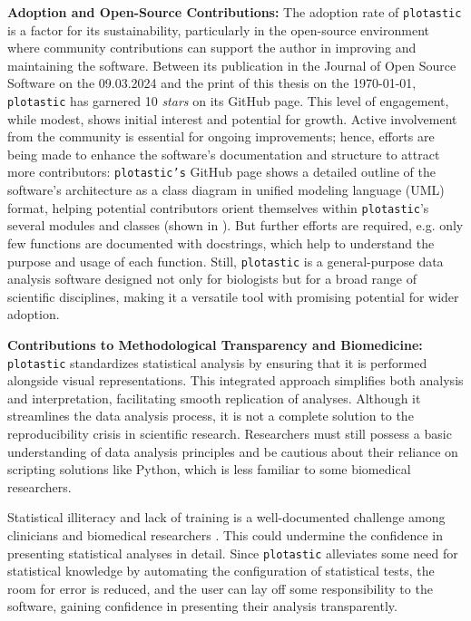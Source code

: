 \textbf{Adoption and Open-Source Contributions:}
The adoption rate of \texttt{plotastic} is a factor for its
sustainability, particularly in the open-source environment where community
contributions can support the author in improving and maintaining
the software. Between its publication in the Journal of Open Source Software on
the 09.03.2024 and the print of this thesis on the \today, \texttt{plotastic}
has garnered 10 \emph{stars}  on its GitHub page. This level of engagement,
while modest, shows initial interest and potential for growth. Active
involvement from the community is essential for ongoing improvements; hence,
efforts are being made to enhance the software's documentation and structure to
attract more contributors: \texttt{plotastic's} GitHub page shows a detailed
outline of the software's architecture as a class diagram in unified modeling
language (UML) format, helping potential contributors orient themselves within
\texttt{plotastic}'s several modules and classes (shown in
). But further efforts are required, e.g. only few
functions are documented with docstrings, which help to understand the purpose
and usage of each function. Still, \texttt{plotastic} is a general-purpose data
analysis software designed not only for biologists but for a broad range of
scientific disciplines, making it a versatile tool with promising potential for
wider adoption.





\textbf{Contributions to Methodological Transparency and Biomedicine:}
\texttt{plotastic} standardizes statistical analysis by ensuring that it is
performed alongside visual representations. This integrated approach simplifies
both analysis and interpretation, facilitating smooth replication of analyses.
Although it streamlines the data analysis process, it is not a complete solution
to the reproducibility crisis in scientific research. Researchers must still
possess a basic understanding of data analysis principles and be cautious about
their reliance on scripting solutions like Python, which is less familiar to
some biomedical researchers.

Statistical illiteracy and lack of training is a well-documented challenge among
clinicians and biomedical researchers
\cite{lakhlifiIllusionKnowledgeStatistics2023, federerDataLiteracyTraining2016}.
This could undermine the confidence in presenting statistical analyses in detail.
Since \texttt{plotastic} alleviates some need for statistical knowledge by
automating the configuration of statistical tests, the room for error is
reduced, and the user can lay off some responsibility to the software, gaining
confidence in presenting their analysis transparently.

